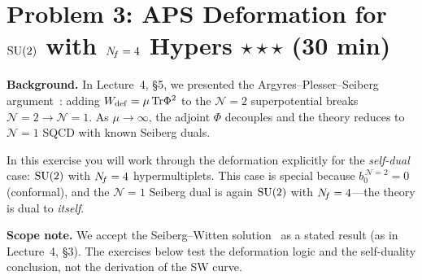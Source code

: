 \documentclass[11pt,a4paper]{article}
\begin{document}
\newpage


\section*{Problem 3: APS Deformation for $\mathrm{SU}(2)$ with $N_{\!f} = 4$
  Hypers \hfill $\star\star\star$ \normalsize(30 min)}
\label{prob:aps-deformation}

\noindent\textbf{Background.}
In Lecture~4, \S5, we presented the Argyres--Plesser--Seiberg
argument~\cite{APS1996}: adding $W_{\mathrm{def}} = \mu\,\mathrm{Tr}\Phi^2$
to the $\mathcal{N}=2$ superpotential breaks $\mathcal{N}=2 \to
\mathcal{N}=1$.  As $\mu \to \infty$, the adjoint $\Phi$ decouples and
the theory reduces to $\mathcal{N}=1$ SQCD with known Seiberg duals.

In this exercise you will work through the deformation explicitly for
the \emph{self-dual} case: $\mathrm{SU}(2)$ with $N_{\!f} = 4$ hypermultiplets.
This case is special because $b_0^{\,\mathcal{N}=2} = 0$
(conformal), and the $\mathcal{N}=1$ Seiberg dual is again $\mathrm{SU}(2)$
with $N_{\!f} = 4$---the theory is dual to \emph{itself}.

\medskip

\noindent\textbf{Scope note.}  We accept the Seiberg--Witten
solution~\cite{SW1994} as a stated result (as in Lecture~4, \S3).
The exercises below test the deformation logic and the self-duality
conclusion, not the derivation of the SW curve.

\medskip
\end{document}

